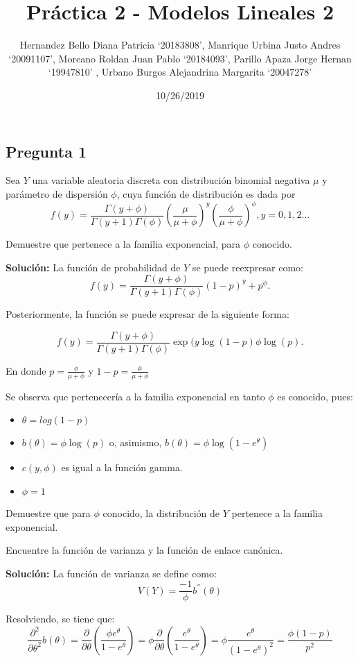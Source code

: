 \documentclass[]{article}
\title{Práctica 2 - Modelos Lineales 2}
\author{Hernandez Bello Diana Patricia `20183808', Manrique Urbina Justo Andres
`20091107', Moreano Roldan Juan Pablo `20184093', Parillo Apaza Jorge
Hernan `19947810' , Urbano Burgos Alejandrina Margarita `20047278'}
\date{10/26/2019}
\providecommand{\tightlist}{%
  \setlength{\itemsep}{0pt}\setlength{\parskip}{0pt}}
\begin{document}
\maketitle

\hypertarget{pregunta-1}{%
\subsection{Pregunta 1}\label{pregunta-1}}

Sea \(Y\) una variable aleatoria discreta con distribución binomial
negativa \(\mu\) y parámetro de dispersión \(\phi\), cuya función de
distribución es dada por
\[ f{(y)}=\frac{\Gamma{(y+\phi)}}{\Gamma{(y+1)}\Gamma{(\phi)}}{(\frac{\mu}{\mu+\phi})}^{y}{(\frac{\phi}{\mu+\phi})}^{\phi}, y=0,1,2\ldots\]

Demuestre que pertenece a la familia exponencial, para \(\phi\)
conocido.

\textbf{Solución:} La función de probabilidad de \(Y\) se puede
reexpresar como:
\[ f{(y)}=\frac{\Gamma{(y+\phi)}}{\Gamma{(y+1)}\Gamma{(\phi)}}{(1-p)}^y+p^\phi.\]

Posteriormente, la función se puede expresar de la siguiente forma:

\[f{(y)}=\frac{\Gamma{(y+\phi)}}{\Gamma{(y+1)}\Gamma{(\phi)}} \exp(y \log(1-p) \phi \log(p).\]

En donde \(p=\frac{\phi}{\mu+\phi}\) y \(1-p=\frac{\mu}{\mu+\phi}\)

Se observa que pertenecería a la familia exponencial en tanto \(\phi\)
es conocido, pues:

\begin{itemize}
\tightlist
\item
  \(\theta=log(1-p)\)
\item
  \(b(\theta)=\phi\log(p)\) o, asimismo,
  \(b(\theta)=\phi\log(1-e^\theta)\)
\item
  \(c(y,\phi)\) es igual a la función gamma.
\item
  \(\phi=1\)
\end{itemize}

Demuestre que para \(\phi\) conocido, la distribución de \(Y\) pertenece
a la familia exponencial.

Encuentre la función de varianza y la función de enlace canónica.

\textbf{Solución:} La función de varianza se define como:
\[V(Y)=\frac{-1}{\phi}b^{''}(\theta)\]

Resolviendo, se tiene que:
\[ \frac{\partial^2}{\partial \theta^2} b(\theta)=\frac{\partial}{\partial \theta}(\frac{\phi e^\theta}{1-e^\theta})=\phi\frac{\partial}{\partial \theta}(\frac{ e^\theta}{1-e^\theta})=\phi \frac{e^\theta}{(1-e^\theta)^2}=\frac{\phi{(1-p)}}{p^2}\]
\end{document}

